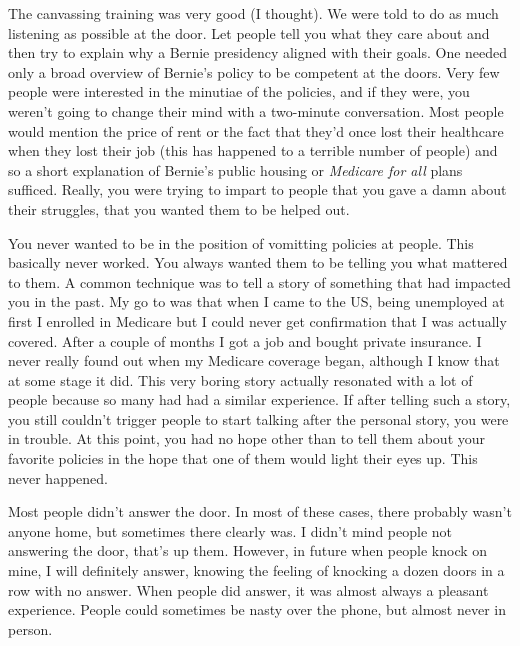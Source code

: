 \documentclass[]{book}
\begin{document}
The canvassing training was very good (I thought). We were told to do as much listening as possible at the door. Let people tell you what they care about and then try to explain why a Bernie presidency aligned with their goals. One needed only a broad overview of Bernie's policy to be competent at the doors. Very few people were interested in the minutiae of the policies, and if they were, you weren't going to change their mind with a two-minute conversation. Most people would mention the price of rent or the fact that they'd once lost their healthcare when they lost their job (this has happened to a terrible number of people) and so a short explanation of Bernie's public housing or \emph{Medicare for all} plans sufficed. Really, you were trying to impart to people that you gave a damn about their struggles, that you wanted them to be helped out.

You never wanted to be in the position of vomitting policies at people. This basically never worked. You always wanted them to be telling you what mattered to them. A common technique was to tell a story of something that had impacted you in the past. My go to was that when I came to the US, being unemployed at first I enrolled in Medicare but I could never get confirmation that I was actually covered. After a couple of months I got a job and bought private insurance. I never really found out when my Medicare coverage began, although I know that at some stage it did. This very boring story actually resonated with a lot of people because so many had had a similar experience. If after telling such a story, you still couldn't trigger people to start talking after the personal story, you were in trouble. At this point, you had no hope other than to tell them about your favorite policies in the hope that one of them would light their eyes up. This never happened.

Most people didn't answer the door. In most of these cases, there probably wasn't anyone home, but sometimes there clearly was. I didn't mind people not answering the door, that's up them. However, in future when people knock on mine, I will definitely answer, knowing the feeling of knocking a dozen doors in a row with no answer. When people did answer, it was almost always a pleasant experience. People could sometimes be nasty over the phone, but almost never in person.
\end{document}

